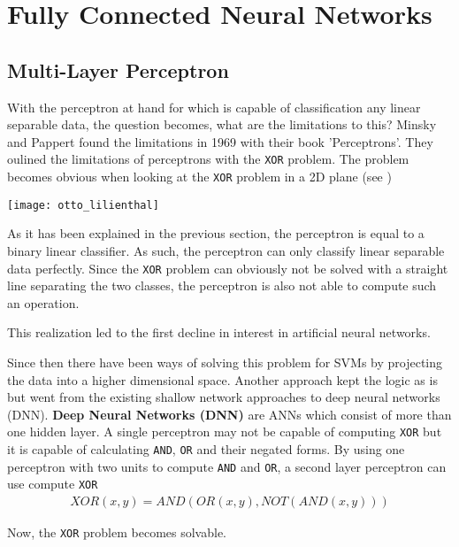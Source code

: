 \section[Fully Connected NNs]{Fully Connected Neural Networks}
\subsection{Multi-Layer Perceptron}
With the perceptron at hand for which is capable of classification any linear separable data, the question becomes, what are the limitations to this?
Minsky and Pappert found the limitations in 1969 with their book 'Perceptrons'.
They oulined the limitations of perceptrons with the \lstinline|XOR| problem.
The problem becomes obvious when looking at the \lstinline|XOR| problem in a 2D plane (see )
\begin{marginfigure}
    \texttt{[image: otto\_lilienthal]}
    \caption[]{\lstinline|OR| and \lstinline|XOR| operations visualized. The \lstinline|XOR| problem cannot be solved by drawing a single line.}
\end{marginfigure}

As it has been explained in the previous section, the perceptron is equal to a binary linear classifier.
As such, the perceptron can only classify linear separable data perfectly.
Since the \lstinline|XOR| problem can obviously not be solved with a straight line separating the two classes, the perceptron is also not able to compute such an operation. 

This realization led to the first decline in interest in artificial neural networks.

Since then there have been ways of solving this problem for SVMs by projecting the data into a higher dimensional space.
Another approach kept the logic as is but went from the existing shallow network approaches to deep neural networks (DNN).
\textbf{Deep Neural Networks (DNN)} are ANNs which consist of more than one hidden layer.
A single perceptron may not be capable of computing \lstinline|XOR| but it is capable of calculating \lstinline|AND|, \lstinline|OR| and their negated forms.
By using one perceptron with two units to compute \lstinline|AND| and \lstinline|OR|, a second layer perceptron can use compute \lstinline|XOR|
\begin{align}
    XOR(x, y) = AND(OR(x, y), NOT(AND(x, y)))
\end{align}

Now, the \lstinline|XOR| problem becomes solvable.

